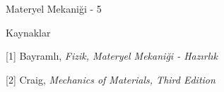 \documentclass[12pt,fleqn]{article}\usepackage{../../common}
\begin{document}
Materyel Mekaniği - 5





Kaynaklar

[1] Bayramlı, {\em Fizik, Materyel Mekaniği - Hazırlık}

[2] Craig, {\em Mechanics of Materials, Third Edition}
\end{document}
